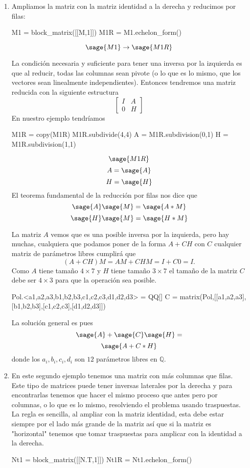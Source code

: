 \documentclass{amsart}
\begin{document}
\begin{enumerate}
\item Ampliamos la matriz con la matriz identidad a la derecha y 
reducimos por filas:

\begin{sageblock}
M1 = block_matrix([[M,1]])
M1R = M1.echelon_form()
\end{sageblock}

$$ \sage{M1} \to \sage{M1R}$$

La condición necesaria y suficiente para tener una inversa por la izquierda
es que al reducir, todas las columnas sean pivote (o lo que es lo mismo,
que los vectores sean linealmente independientes). Entonces tendremos
una matriz reducida con la siguiente estructura
$$ \left[\begin{array}{c|c} I & A \\ \hline 0 & H \end{array}\right]$$
En nuestro ejemplo tendríamos

\begin{sageblock}
M1R = copy(M1R)
M1R.subdivide(4,4)
A = M1R.subdivision(0,1)
H = M1R.subdivision(1,1)
\end{sageblock}

$$\sage{M1R}$$
$$ A = \sage{A} $$
$$ H = \sage{H} $$
El teorema fundamental de la reducción por filas nos dice que 
$$ \sage{A} \sage{M} = \sage{A*M} $$
$$ \sage{H} \sage{M} = \sage{H*M} $$

La matriz $A$ vemos que es una posible inversa por la izquierda, pero 
hay muchas, cualquiera que podamos poner de la forma $A+CH$ con $C$
cualquier matriz de parámetros libres cumplirá que
$$ (A+CH)M = AM + CHM = I + C0 = I.$$
Como $A$ tiene tamaño $4 \times 7$ y $H$ tiene tamaño $3 \times 7$
el tamaño de la matriz $C$ debe ser $4 \times 3$ para que la operación
sea posible.

\begin{sageblock}
Pol.<a1,a2,a3,b1,b2,b3,c1,c2,c3,d1,d2,d3> = QQ[]
C = matrix(Pol,[[a1,a2,a3],[b1,b2,b3],[c1,c2,c3],[d1,d2,d3]])
\end{sageblock}

La solución general es pues
$$ \sage{A} + \sage{C} \sage{H} = $$
$$ \sage{A+C*H}$$
donde los $a_i,b_i,c_i,d_i$ son $12$ parámetros libres en ${\mathbb Q}$.

\item En este segundo ejemplo tenemos una matriz con más columnas que filas.
Este tipo de matrices puede tener inversas laterales por la derecha y para
encontrarlas tenemos que hacer el mismo proceso que antes pero por columnas,
o lo que es lo mismo, resolviendo el problema usando traspuestas. La regla
es sencilla, al ampliar con la matriz identidad, esta debe estar siempre por 
el lado más grande de la matriz así que si la matriz es "horizontal" tenemos
que tomar traspuestas para amplicar con la identidad a la derecha.

\begin{sageblock}
Nt1 = block_matrix([[N.T,1]])
Nt1R = Nt1.echelon_form()
\end{sageblock}
\end{enumerate}
\end{document}
